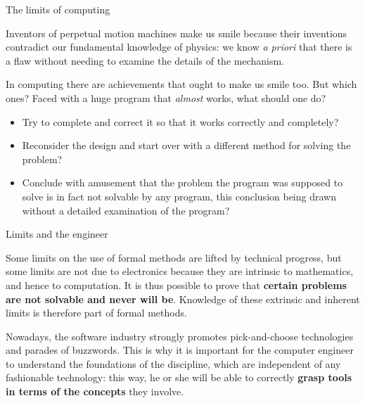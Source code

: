 \documentclass[compress,dvips,xcolor={dvipsnames},t]{beamer}
\begin{document}
%
\begin{frame}{The limits of computing}

  Inventors of perpetual motion machines make us smile because their
  inventions contradict our fundamental knowledge of physics: we know
  \emph{a priori} that there is a flaw without needing to examine the
  details of the mechanism.

  \bigskip

  In computing there are achievements that ought to make us smile
  too. But which ones? Faced with a huge program that \emph{almost}
  works, what should one do?
  \begin{itemize}

    \item Try to complete and correct it so that it works correctly
      and completely?

    \item Reconsider the design and start over with a different method
      for solving the problem?

    \item Conclude with amusement that the problem the program was
      supposed to solve is in fact not solvable by any program, this
      conclusion being drawn without a detailed examination of the
      program?

  \end{itemize}

\end{frame}

%
\begin{frame}{Limits and the engineer}

  Some limits on the use of formal methods are lifted by technical
  progress, but some limits are not due to electronics because they
  are intrinsic to mathematics, and hence to computation. It is thus
  possible to prove that \textbf{certain problems are not solvable and
    never will be}. Knowledge of these extrinsic and inherent limits
  is therefore part of formal methods.

  \bigskip

  Nowadays, the software industry strongly promotes
  pick\hyp{}and\hyp{}choose technologies and parades of
  buzzwords. This is why it is important for the computer engineer to
  understand the foundations of the discipline, which are independent
  of any fashionable technology: this way, he or she will be able to
  correctly \textbf{grasp tools in terms of the concepts} they
  involve.

\end{frame}
\end{document}
